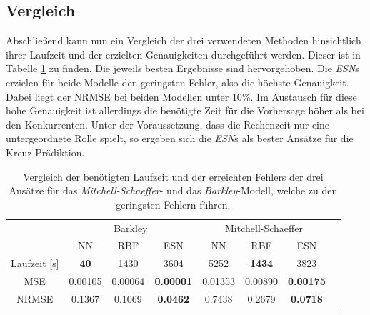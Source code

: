 \subsection{Vergleich}
Abschließend kann nun ein Vergleich der drei verwendeten Methoden hinsichtlich ihrer Laufzeit und der erzielten Genauigkeiten durchgeführt werden. Dieser ist in Tabelle \ref{tab:exp_cross_comparison_results} zu finden. Die jeweils  besten Ergebnisse sind hervorgehoben. Die \textit{ESN}s erzielen für beide Modelle den geringsten Fehler, also die höchste Genauigkeit. Dabei liegt der NRMSE bei beiden Modellen unter $10\%$. Im Austausch für diese hohe Genauigkeit ist allerdings die benötigte Zeit für die Vorhersage höher als bei den Konkurrenten. Unter der Voraussetzung, dass die Rechenzeit nur eine untergeordnete Rolle spielt, so ergeben sich die \textit{ESN}s als bester Ansätze für die Kreuz-Prädiktion.
\begin{table}[h]
	\centering
	\captionsetup{width=0.9\linewidth}
	\begin{tabular}{|c|c|c|c|c|c|c|c|}
		\multicolumn{1}{c|}{} & \multicolumn{3}{c|}{Barkley} & \multicolumn{3}{c|}{Mitchell-Schaeffer}		\\
		\cline{2-7}
		\multicolumn{1}{c|}{} & NN & RBF & ESN & NN & RBF & ESN \\
		
		\hline
		\hline
		
		Laufzeit [s] 	& \textbf{40} 		& 1430		& 3604		& 5252		& \textbf{1434} 		& 3823 \\
		\hline
		MSE 			& 0.00105	& 0.00064	& \textbf{0.00001} 	& 0.01353	& 0.00890 	& \textbf{0.00175} \\
		\hline
		NRMSE 			& 0.1367	& 0.1069	& \textbf{0.0462} 	& 0.7438	& 0.2679 	& \textbf{0.0718} \\
		\hline 
	\end{tabular} 
	\caption{Vergleich der benötigten Laufzeit und der erreichten Fehlers der drei Ansätze für das \textit{Mitchell-Schaeffer}- und das \textit{Barkley}-Modell, welche zu den geringsten Fehlern führen.}
	\label{tab:exp_cross_comparison_results}
\end{table}

\FloatBarrier